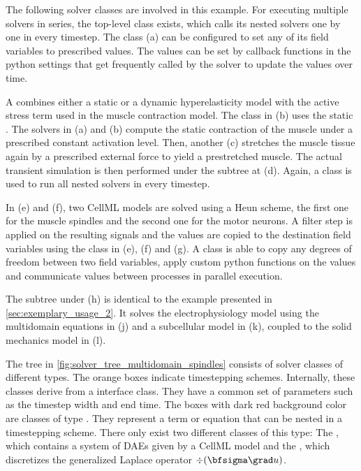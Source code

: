 The following solver classes are involved in this example. For executing multiple solvers in series, the top-level  class exists, which calls its nested solvers one by one in every timestep.
The  class (a) can be configured to set any of its field variables to prescribed values. The values can be set by callback functions in the python settings that get frequently called by the solver to update the values over time.

A  combines either a static or a dynamic hyperelasticity model with the active stress term used in the muscle contraction model. The class in (b) uses the static . The solvers in (a) and (b) compute the static contraction of the muscle under a prescribed constant activation level. Then, another  (c) stretches the muscle tissue again by a prescribed external force to yield a prestretched muscle. The actual transient simulation is then performed under the subtree at (d). 
Again, a  class is used to run all nested solvers in every timestep.

In (e) and (f), two CellML models are solved using a Heun scheme, the first one for the muscle spindles and the second one for the motor neurons. A filter step is applied on the resulting signals and the values are copied to the destination field variables using the  class in (e), (f) and (g). A  class is able to copy any degrees of freedom between two field variables, apply custom python functions on the values and communicate values between processes in parallel execution.

The subtree under (h) is identical to the example presented in \cref{sec:exemplary_usage_2}. It solves the electrophysiology model using the multidomain equations in (j) and a subcellular model in (k), coupled to the solid mechanics model in (l).

The tree in \cref{fig:solver_tree_multidomain_spindles} consists of solver classes of different types. The orange boxes indicate timestepping schemes. Internally, these classes derive from a  interface class. They have a common set of parameters such as the timestep width and end time.
The boxes with dark red background color are classes of type . They represent a term or equation that can be nested in a timestepping scheme. There only exist two different classes of this type: The , which contains a system of DAEs given by a CellML model and the , which discretizes the generalized Laplace operator $\div(\bfsigma \grad u)$.

